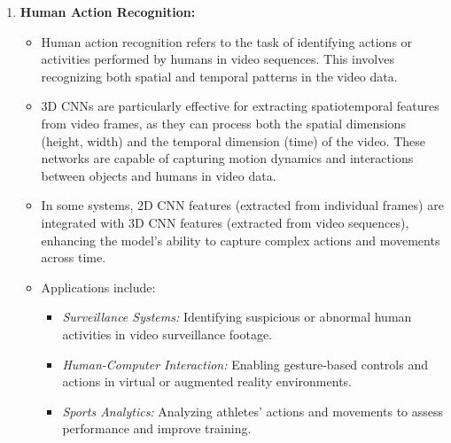 \begin{enumerate}
	\item \textbf{Human Action Recognition:} \cite{Mardiyanto:2017}
	\begin{itemize}
		\item Human action recognition refers to the task of identifying actions or activities performed by humans in video sequences. This involves recognizing both spatial and temporal patterns in the video data.
		\item 3D CNNs are particularly effective for extracting spatiotemporal features from video frames, as they can process both the spatial dimensions (height, width) and the temporal dimension (time) of the video. These networks are capable of capturing motion dynamics and interactions between objects and humans in video data.
		\item In some systems, 2D CNN features (extracted from individual frames) are integrated with 3D CNN features (extracted from video sequences), enhancing the model's ability to capture complex actions and movements across time.
		\item Applications include:
		\begin{itemize}
			\item \textit{Surveillance Systems:} Identifying suspicious or abnormal human activities in video surveillance footage.
			\item \textit{Human-Computer Interaction:} Enabling gesture-based controls and actions in virtual or augmented reality environments.
			\item \textit{Sports Analytics:} Analyzing athletes' actions and movements to assess performance and improve training.
		\end{itemize}
	\end{itemize}
	

\end{enumerate}
